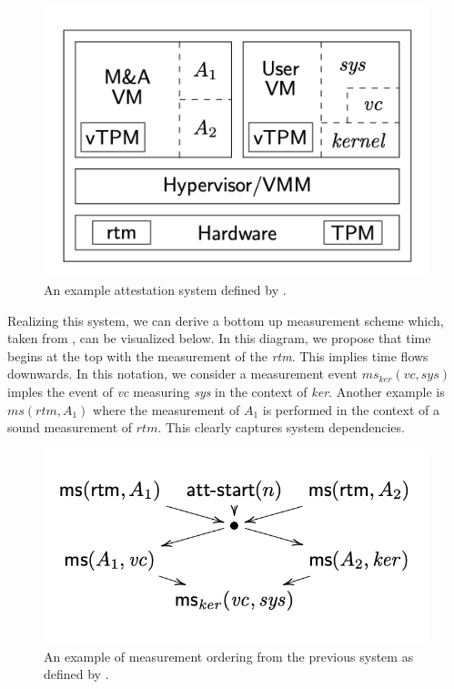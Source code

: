 \documentclass[12pt, letterpaper]{article}
\begin{document}
\begin{figure}[]
  \centering
  \includegraphics[scale=.45]{AttSystemRowe.png}
  \caption{An example attestation system defined by \cite{Rowe::Bundling}.}
  \label{att-system-rowe}
\end{figure}

Realizing this system, we can derive a bottom up measurement scheme which, taken from \cite{Rowe::Bundling}, can be visualized below. In this diagram, we propose that time begins at the top with the measurement of  the \emph{rtm}. This implies time flows downwards. In this notation, we consider a measurement event $ms_{ker}(vc,sys)$ imples the event of \emph{vc} measuring \emph{sys} in the context of \emph{ker}. Another example is $ms(rtm,A_1)$ where the measurement of $A_1$ is performed in the context of a sound measurement of $rtm$. This clearly captures system dependencies. 

\begin{figure}[hbtp]
  \centering
  \includegraphics[scale=.5]{MeasOrdRowe.png}
  \caption{An example of measurement ordering from the previous system as defined by \cite{Rowe::Bundling}.}
  \label{meas-ord-rowe}
\end{figure}
\end{document}
